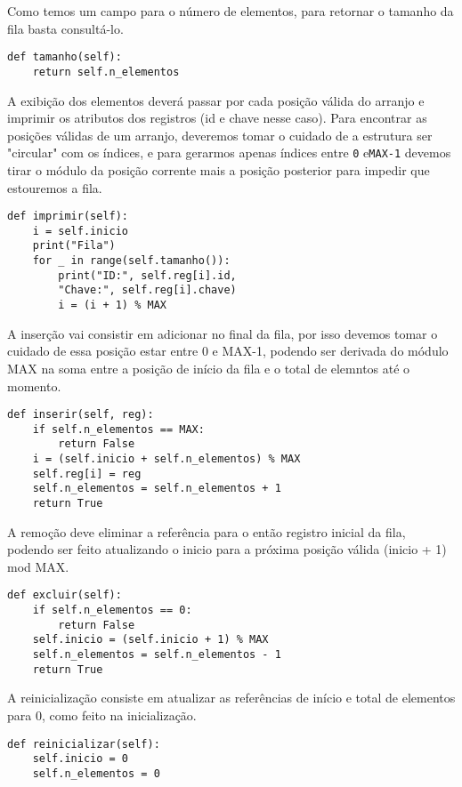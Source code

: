 \documentclass[a4paper, twocolumn]{article}
\theoremstyle{definition}
\begin{document}
Como temos um campo para o número de elementos, para retornar o tamanho da fila basta consultá-lo.
\begin{lstlisting}[label=fila_estat_tamanho, caption= Fila estática (tamanho)]
def tamanho(self):
    return self.n_elementos
\end{lstlisting}

A exibição dos elementos deverá passar por cada posição válida do arranjo e imprimir os atributos dos registros (id e chave nesse caso). Para encontrar as posições válidas de um arranjo, deveremos tomar o cuidado de a estrutura ser "circular" com os índices, e para gerarmos apenas índices entre \texttt{0} e\texttt{MAX-1} devemos tirar o módulo da posição corrente mais a posição posterior para impedir que estouremos a fila.
\begin{lstlisting}[label=fila_estat_imprimir, caption= Fila estática (exibição)]
def imprimir(self):
    i = self.inicio
    print("Fila")
    for _ in range(self.tamanho()):
        print("ID:", self.reg[i].id,
        "Chave:", self.reg[i].chave)
        i = (i + 1) % MAX
    \end{lstlisting}

A inserção vai consistir em adicionar no final da fila, por isso devemos tomar o cuidado de essa posição estar entre 0 e MAX-1, podendo ser derivada do módulo MAX na soma entre a posição de início da fila e o total de elemntos até o momento.
\begin{lstlisting}[label=fila_estat_inserir, caption= Fila estática (inserção)]
def inserir(self, reg):
    if self.n_elementos == MAX:
        return False
    i = (self.inicio + self.n_elementos) % MAX
    self.reg[i] = reg
    self.n_elementos = self.n_elementos + 1
    return True
\end{lstlisting}

A remoção deve eliminar a referência para o então registro inicial da fila, podendo ser feito atualizando o inicio para a próxima posição válida (inicio + 1) mod MAX.
\begin{lstlisting}[label=fila_estat_excluir, caption= Fila estática (remoção)]
def excluir(self):
    if self.n_elementos == 0: 
        return False
    self.inicio = (self.inicio + 1) % MAX
    self.n_elementos = self.n_elementos - 1
    return True
\end{lstlisting}

A reinicialização consiste em atualizar as referências de início e total de elementos para 0, como feito na inicialização.
\begin{lstlisting}[label=fila_estat_reiniciar, caption= Fila estática (reinicialização)]
def reinicializar(self):
    self.inicio = 0
    self.n_elementos = 0
\end{lstlisting}
\end{document}
